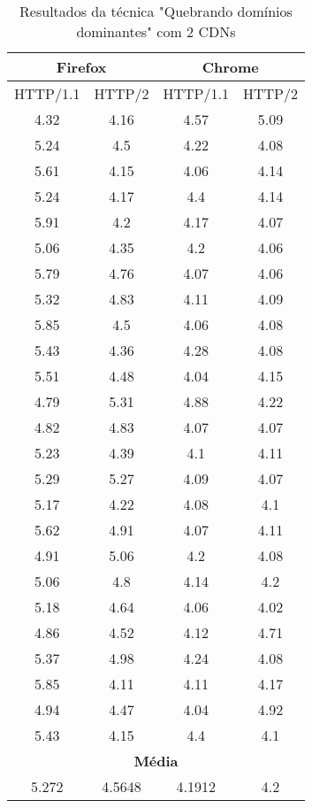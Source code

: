 \begin{table}[h]
	\centering
	\caption{Resultados da técnica "Quebrando domínios dominantes" com 2 CDNs}
	\label{resultados-quebrandodominiosdominantes-2}
	\begin{tabular}{cccc}
		\hline
		\multicolumn{2}{c}{\textbf{Firefox}} & \multicolumn{2}{c}{\textbf{Chrome}} \\
		\hline
		HTTP/1.1 & HTTP/2 & HTTP/1.1 & HTTP/2 \\
		\hline
		4.32 & 4.16 & 4.57 & 5.09 \\
		5.24 & 4.5 & 4.22 & 4.08 \\
		5.61 & 4.15 & 4.06 & 4.14 \\
		5.24 & 4.17 & 4.4 & 4.14 \\
		5.91 & 4.2 & 4.17 & 4.07 \\
		5.06 & 4.35 & 4.2 & 4.06 \\
		5.79 & 4.76 & 4.07 & 4.06 \\
		5.32 & 4.83 & 4.11 & 4.09 \\
		5.85 & 4.5 & 4.06 & 4.08 \\
		5.43 & 4.36 & 4.28 & 4.08 \\
		5.51 & 4.48 & 4.04 & 4.15 \\
		4.79 & 5.31 & 4.88 & 4.22 \\
		4.82 & 4.83 & 4.07 & 4.07 \\
		5.23 & 4.39 & 4.1 & 4.11 \\
		5.29 & 5.27 & 4.09 & 4.07 \\
		5.17 & 4.22 & 4.08 & 4.1 \\
		5.62 & 4.91 & 4.07 & 4.11 \\
		4.91 & 5.06 & 4.2 & 4.08 \\
		5.06 & 4.8 & 4.14 & 4.2 \\
		5.18 & 4.64 & 4.06 & 4.02 \\
		4.86 & 4.52 & 4.12 & 4.71 \\
		5.37 & 4.98 & 4.24 & 4.08 \\
		5.85 & 4.11 & 4.11 & 4.17 \\
		4.94 & 4.47 & 4.04 & 4.92 \\
		5.43 & 4.15 & 4.4 & 4.1 \\
		\hline
		\multicolumn{4}{c}{\textbf{Média}} \\
		5.272 & 4.5648 & 4.1912 & 4.2 \\
		\hline
	\end{tabular}
\end{table}